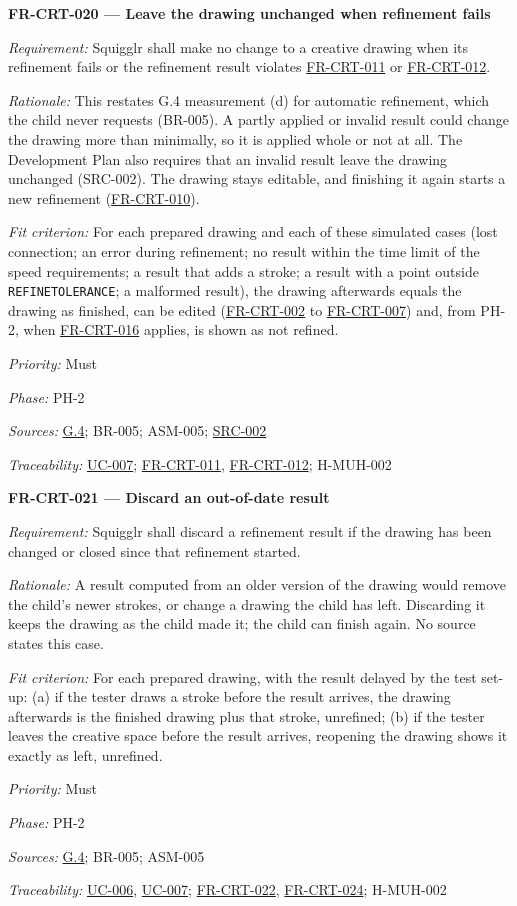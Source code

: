 \documentclass[12pt]{article}
\renewcommand{\_}{\textunderscore\allowbreak}%
\newcommand{\goalref}[1]{\hyperref[goal:#1]{G.#1}}
\newcommand{\ucref}[1]{\hyperref[uc:#1]{\mbox{UC-#1}}}
\newenvironment{srsrequirement}[2]{%
  \par\medskip\noindent\phantomsection\label{req:#1}%
  \textbf{#1 --- #2}\par\nobreak\smallskip }{\par\medskip}
\newcommand{\reqfield}[2]{\noindent\textit{#1:} #2\par}
\newcommand{\reqshall}[1]{\reqfield{Requirement}{#1}}
\newcommand{\reqrationale}[1]{\reqfield{Rationale}{#1}}
\newcommand{\reqfit}[1]{\reqfield{Fit criterion}{#1}}
\newcommand{\reqpriority}[1]{\reqfield{Priority}{#1}}
\newcommand{\reqphase}[1]{\reqfield{Phase}{#1}}
\newcommand{\reqsources}[1]{\reqfield{Sources}{#1}}
\newcommand{\reqtraces}[1]{\reqfield{Traceability}{#1}}
\newcommand{\reqref}[1]{\hyperref[req:#1]{#1}}
\newcommand{\srcref}[1]{\hyperref[src:#1]{SRC-#1}}
\providecommand{\ucref}[1]{\hyperref[uc:#1]{UC-#1}}
\begin{document}
\begin{srsrequirement}{FR-CRT-020}{Leave the drawing unchanged when refinement fails}
  \reqshall{Squigglr shall make no change to a creative drawing when its
refinement fails or the refinement result violates \reqref{FR-CRT-011} or
\reqref{FR-CRT-012}.} \reqrationale{This restates G.4 measurement (d) for
automatic refinement, which the child never requests (BR-005). A partly applied
or invalid result could change the drawing more than minimally, so it is applied
whole or not at all. The Development Plan also requires that an invalid result
leave the drawing unchanged (SRC-002). The drawing stays editable, and finishing
it again starts a new refinement (\reqref{FR-CRT-010}).} \reqfit{For each
prepared drawing and each of these simulated cases (lost connection; an error
during refinement; no result within the time limit of the speed requirements; a
result that adds a stroke; a result with a point outside
\texttt{REFINE\_\allowbreak TOLERANCE}; a malformed result), the drawing
afterwards equals the drawing as finished, can be edited (\reqref{FR-CRT-002} to
\reqref{FR-CRT-007}) and, from PH-2, when \reqref{FR-CRT-016} applies, is shown
as not refined.}
  \reqpriority{Must}
  \reqphase{PH-2}
  \reqsources{\goalref{4}; BR-005; ASM-005; \srcref{002}}
  \reqtraces{\ucref{007}; \reqref{FR-CRT-011}, \reqref{FR-CRT-012}; H-MUH-002}
\end{srsrequirement}

\begin{srsrequirement}{FR-CRT-021}{Discard an out-of-date result}
  \reqshall{Squigglr shall discard a refinement result if the drawing has been
changed or closed since that refinement started.} \reqrationale{A result
computed from an older version of the drawing would remove the child's newer
strokes, or change a drawing the child has left. Discarding it keeps the drawing
as the child made it; the child can finish again. No source states this case.}
\reqfit{For each prepared drawing, with the result delayed by the test set-up:
(a) if the tester draws a stroke before the result arrives, the drawing
afterwards is the finished drawing plus that stroke, unrefined; (b) if the
tester leaves the creative space before the result arrives, reopening the
drawing shows it exactly as left, unrefined.}
  \reqpriority{Must}
  \reqphase{PH-2}
  \reqsources{\goalref{4}; BR-005; ASM-005} \reqtraces{\ucref{006}, \ucref{007};
  \reqref{FR-CRT-022}, \reqref{FR-CRT-024}; H-MUH-002}
\end{srsrequirement}
\end{document}
